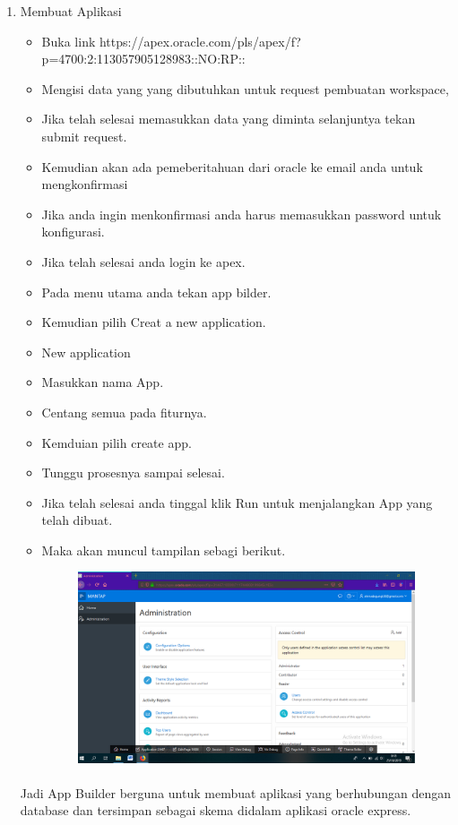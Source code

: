 \documentclass{article}
\begin{document}
\begin{enumerate}
    \item Membuat Aplikasi
        \begin{itemize}
            \item Buka link https://apex.oracle.com/pls/apex/f?p=4700:2:113057905128983::NO:RP::
            \item Mengisi data yang yang dibutuhkan untuk request pembuatan workspace,
            \item Jika telah selesai memasukkan data yang diminta selanjuntya tekan submit request.
            \item Kemudian akan ada pemeberitahuan dari oracle ke email anda untuk mengkonfirmasi
            \item Jika anda ingin menkonfirmasi anda harus memasukkan password untuk konfigurasi.
            \item Jika telah selesai anda login ke apex.
            \item Pada menu utama anda tekan app bilder.
            \item Kemudian pilih Creat a new application.
            \item New application
            \item Masukkan nama App.
            \item Centang semua pada fiturnya.
            \item Kemduian pilih create app.
            \item Tunggu prosesnya sampai selesai.
            \item Jika telah selesai anda tinggal klik Run untuk menjalangkan App yang telah dibuat.
            \item Maka akan muncul tampilan sebagi berikut.
                \begin{figure}
                    \includegraphics[width=15cm]{1.PNG}
                \end{figure}
        \end{itemize}
    \paragraph{} Jadi App Builder berguna untuk membuat aplikasi yang berhubungan dengan database dan tersimpan sebagai skema didalam aplikasi oracle express.
\end{enumerate}
\end{document}
